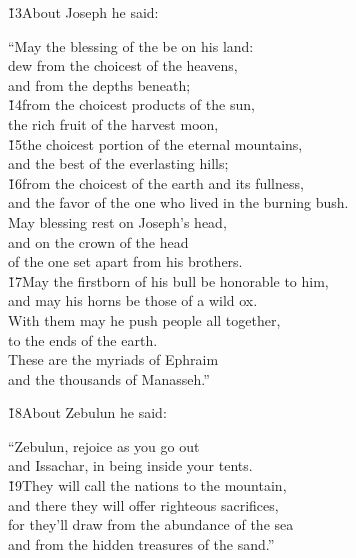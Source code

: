 \v{13}About Joseph he said:

\begin{poetry}
\poeml ``May the blessing of the  be on his land: \\
\poemll    dew from the choicest of the heavens, \\
\poemlll       and from the depths beneath; \\
\poeml \v{14}from the choicest products of the sun, \\
\poemll    the rich fruit of the harvest moon, \\
\poeml \v{15}the choicest portion of the eternal mountains, \\
\poemll    and the best of the everlasting hills; \\
\poeml \v{16}from the choicest of the earth and its fullness, \\
\poemll    and the favor of the one who lived in the burning bush. \\
\poeml May blessing rest on Joseph's head, \\
\poemll    and on the crown of the head \\
\poemlll       of the one set apart from his brothers. \\
\poeml \v{17}May the firstborn of his bull be honorable to him, \\
\poemll    and may his horns be those of a wild ox. \\
\poeml With them may he push people all together, \\
\poemll    to the ends of the earth. \\
\poeml These are the myriads of Ephraim \\
\poemll    and the thousands of Manasseh.''
\end{poetry}

\v{18}About Zebulun he said:

\begin{poetry}
\poeml ``Zebulun, rejoice as you go out \\
\poemll    and Issachar, in being inside your tents. \\
\poeml \v{19}They will call the nations to the mountain, \\
\poemll    and there they will offer righteous sacrifices, \\
\poeml for they'll draw from the abundance of the sea \\
\poemll    and from the hidden treasures of the sand.''
\end{poetry}

